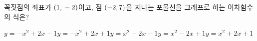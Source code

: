 \hspace*{2mm}\begin{minipage}[t]{\dimexpr\linewidth-2mm\relax}\vspace{0pt}
꼭짓점의 좌표가 $(1{,}\mkern3mu -2)$이고, 점 $(-2{,}\mkern3mu 7)$을 지나는 포물선을 그래프로 하는 이차함수의 식은?
\begin{choicesii}{$y=-x^2+2x-1$}{$y=-x^2+2x+1$}{$y=x^2-2x-1$}{$y=x^2-2x+1$}{$y=x^2+2x+1$}\end{choicesii}\end{minipage}
